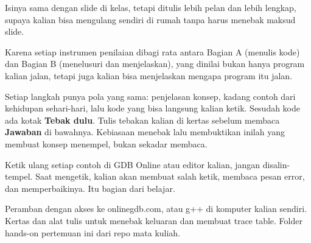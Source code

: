 \documentclass[a4paper]{article}
\begin{document}
Isinya sama dengan slide di kelas, tetapi ditulis lebih pelan dan lebih lengkap, supaya kalian bisa mengulang sendiri di rumah tanpa harus menebak maksud slide.

\par\vspace{4pt}\par\vspace{6pt}
Karena setiap instrumen penilaian dibagi rata antara Bagian A (menulis kode) dan Bagian B (menelusuri dan menjelaskan), yang dinilai bukan hanya program kalian jalan, tetapi juga kalian bisa menjelaskan mengapa program itu jalan.

Setiap langkah punya pola yang sama: penjelasan konsep, kadang contoh dari kehidupan sehari-hari, lalu kode yang bisa langsung kalian ketik. Sesudah kode ada kotak \textbf{Tebak dulu}. Tulis tebakan kalian di kertas sebelum membaca \textbf{Jawaban} di bawahnya. Kebiasaan menebak lalu membuktikan inilah yang membuat konsep menempel, bukan sekadar membaca.

\begin{Penting}
Ketik ulang setiap contoh di GDB Online atau editor kalian, jangan disalin-tempel. Saat mengetik, kalian akan membuat salah ketik, membaca pesan error, dan memperbaikinya. Itu bagian dari belajar.
\end{Penting}
Peramban dengan akses ke onlinegdb.com, atau g++ di komputer kalian sendiri. Kertas dan alat tulis untuk menebak keluaran dan membuat trace table. Folder hands-on pertemuan ini dari repo mata kuliah.
\end{document}
